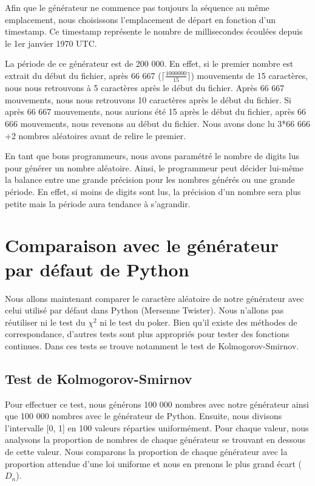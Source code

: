 \documentclass[10pt,a4paper]{article}
\begin{document}
	Afin que le générateur ne commence pas toujours la séquence au même emplacement, nous choisissons l'emplacement de départ en fonction d'un timestamp.
	Ce timestamp représente le nombre de millisecondes écoulées depuis le 1er janvier 1970 UTC.
	
	La période de ce générateur est de 200 000.
	En effet, si le premier nombre est extrait du début du fichier, après 66 667 ($\lceil\frac{1 000 000}{15}\rceil$) mouvements de 15 caractères, nous nous retrouvons à 5 caractères après le début du fichier.
	Après 66 667 mouvements, nous nous retrouvons 10 caractères après le début du fichier.
	Si après 66 667 mouvements, nous aurions été 15 après le début du fichier, après 66 666 mouvements, nous revenons au début du fichier.
	Nous avons donc lu 3*66 666 +2 nombres aléatoires avant de relire le premier.
	
	En tant que bons programmeurs, nous avons paramétré le nombre de digits lus pour générer un nombre aléatoire.
	Ainsi, le programmeur peut décider lui-même la balance entre une grande précision pour les nombres générés ou une grande période.
	En effet, si moins de digits sont lus, la précision d'un nombre sera plus petite mais la période aura tendance à s'agrandir.
	
	\newpage
	\section{Comparaison avec le générateur par défaut de Python}
	Nous allons maintenant comparer le caractère aléatoire de notre générateur avec celui utilisé par défaut dans Python (Mersenne Twister).
	Nous n'allons pas réutiliser ni le test du $\chi^2$ ni le test du poker.
	Bien qu'il existe des méthodes de correspondance, d'autres tests sont plus appropriés pour tester des fonctions continues.
	Dans ces tests se trouve notamment le test de Kolmogorov-Smirnov.
	
	\newpage
	\subsection{Test de Kolmogorov-Smirnov}
	
	Pour effectuer ce test, nous générons 100 000 nombres avec notre générateur ainsi que 100 000 nombres avec le générateur de Python.
	Ensuite, nous divisons l'intervalle [0, 1] en 100 valeurs réparties uniformément.
	Pour chaque valeur, nous analysons la proportion de nombres de chaque générateur se trouvant en dessous de cette valeur.
	Nous comparons la proportion de chaque générateur avec la proportion attendue d'une loi uniforme et nous en prenons le plus grand écart ($D_n$).
	
\end{document}
